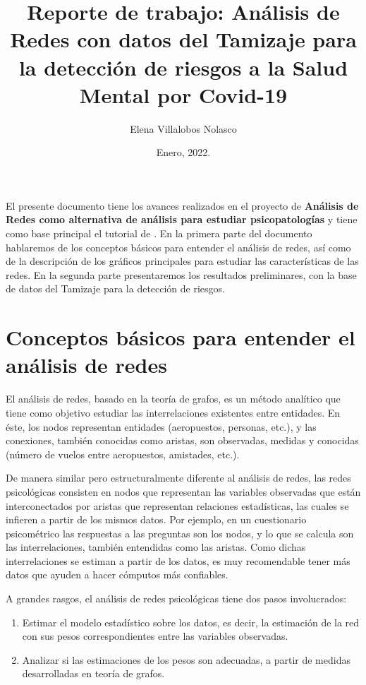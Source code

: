 \documentclass[11pt,spanish]{article}\usepackage[]{graphicx}\usepackage[]{color}
\title{\huge{Reporte de trabajo: Análisis de Redes con datos del Tamizaje para la detección de riesgos a la Salud Mental por Covid-19}}
\author[ ]{Elena Villalobos Nolasco}
\date{Enero, 2022.}
\begin{document}
\maketitle


El presente documento tiene los avances realizados en el proyecto de {\bf Análisis de Redes como alternativa de análisis para estudiar psicopatologías} y tiene como base principal el tutorial de \cite{main_tutorial}. En la primera parte del documento hablaremos de los conceptos básicos para entender el análisis de redes, así como de la descripción de los gráficos principales para estudiar las características de las redes. En la segunda parte presentaremos los resultados preliminares, con la base de datos del Tamizaje para la detección de riesgos. 


\section{Conceptos básicos para entender el análisis de redes}

El análisis de redes, basado en la teoría de grafos, es un método analítico que tiene como objetivo estudiar las interrelaciones existentes entre entidades. En éste, los nodos representan entidades (aeropuestos, personas, etc.), y las conexiones, también conocidas como aristas, son observadas, medidas y conocidas (número de vuelos entre aeropuestos, amistades, etc.). 

De manera similar pero estructuralmente diferente al análisis de redes, las redes psicológicas consisten en nodos que representan las variables observadas que están interconectados por aristas que representan relaciones estadísticas, las cuales se infieren a partir de los mismos datos. Por ejemplo, en un cuestionario psicométrico las respuestas a las preguntas son los nodos, y lo que se calcula son las interrelaciones, también entendidas como las aristas. Como dichas interrelaciones se estiman a partir de los datos, es muy recomendable tener más datos que ayuden a hacer cómputos más confiables.

A grandes rasgos, el análisis de redes psicológicas tiene dos pasos involucrados:

\begin{enumerate}
  \item Estimar el modelo estadístico sobre los datos, es decir, la estimación de la red con sus pesos correspondientes entre las variables observadas. 
  \item Analizar si las estimaciones de los pesos son adecuadas, a partir de medidas desarrolladas en teoría de grafos. 
\end{enumerate}
\end{document}
